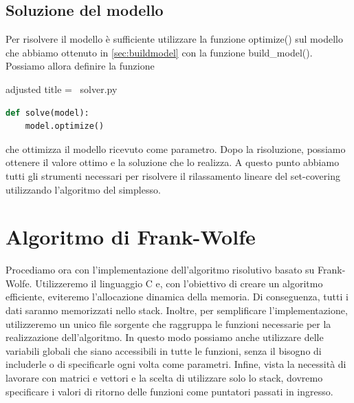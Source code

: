 \subsection{Soluzione del modello}
Per risolvere il modello è sufficiente utilizzare la funzione {\jbm optimize()} sul modello che abbiamo ottenuto in
\ref{sec:buildmodel} con la funzione {\jbm build\_model()}. Possiamo allora definire la funzione
\begin{code}{adjusted title = {\pyicon\ solver.py}}
\begin{lstlisting}[language=python, style = style, caption={Soluzione del modello con l'algoritmo del simplesso.}]
def solve(model):
    model.optimize()
\end{lstlisting}
\end{code}
\noindent
che ottimizza il modello ricevuto come parametro. Dopo la risoluzione, possiamo ottenere il valore ottimo e la soluzione
che lo realizza.
A questo punto abbiamo tutti gli strumenti necessari per risolvere il rilassamento lineare del set-covering utilizzando
l'algoritmo del simplesso.

\section{Algoritmo di Frank-Wolfe}
Procediamo ora con l'implementazione dell'algoritmo risolutivo basato su Frank-Wolfe. Utilizzeremo il linguaggio C e,
con l'obiettivo di creare un algoritmo efficiente, eviteremo l'allocazione dinamica della memoria. Di conseguenza, tutti
i dati saranno memorizzati nello stack. Inoltre, per semplificare l'implementazione, utilizzeremo un unico file sorgente
che raggruppa le funzioni necessarie per la realizzazione dell'algoritmo. In questo modo possiamo anche utilizzare delle
variabili globali che siano accessibili in tutte le funzioni, senza il bisogno di includerle o di specificarle ogni volta come
parametri. Infine, vista la necessità di lavorare con matrici e vettori e la scelta di utilizzare solo lo stack, dovremo
specificare i valori di ritorno delle funzioni come puntatori passati in ingresso.

